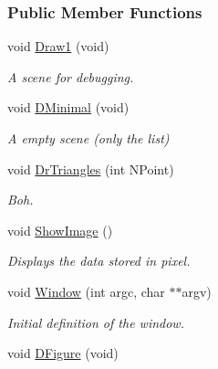 \subsubsection*{\-Public \-Member \-Functions}
\begin{DoxyCompactItemize}
\item 
\hypertarget{classDraw_a6d1a6c1ede3d0e58cbf0534c9c3ba943}{void \hyperlink{classDraw_a6d1a6c1ede3d0e58cbf0534c9c3ba943}{\-Draw1} (void)}\label{classDraw_a6d1a6c1ede3d0e58cbf0534c9c3ba943}

\begin{DoxyCompactList}\small\item\em \-A scene for debugging. \end{DoxyCompactList}\item 
\hypertarget{classDraw_a13a208315366febdc9db2eefb5f354ab}{void \hyperlink{classDraw_a13a208315366febdc9db2eefb5f354ab}{\-D\-Minimal} (void)}\label{classDraw_a13a208315366febdc9db2eefb5f354ab}

\begin{DoxyCompactList}\small\item\em \-A empty scene (only the list) \end{DoxyCompactList}\item 
\hypertarget{classDraw_a4d4cb243d25c9778b824719fc01d8b68}{void \hyperlink{classDraw_a4d4cb243d25c9778b824719fc01d8b68}{\-Dr\-Triangles} (int \-N\-Point)}\label{classDraw_a4d4cb243d25c9778b824719fc01d8b68}

\begin{DoxyCompactList}\small\item\em \-Boh. \end{DoxyCompactList}\item 
\hypertarget{classDraw_aded17e5e58c8d26011c3d2120b259fed}{void \hyperlink{classDraw_aded17e5e58c8d26011c3d2120b259fed}{\-Show\-Image} ()}\label{classDraw_aded17e5e58c8d26011c3d2120b259fed}

\begin{DoxyCompactList}\small\item\em \-Displays the data stored in pixel. \end{DoxyCompactList}\item 
\hypertarget{classDraw_a6768324ebecaa6d87d6e65bf242b23f9}{void \hyperlink{classDraw_a6768324ebecaa6d87d6e65bf242b23f9}{\-Window} (int argc, char $\ast$$\ast$argv)}\label{classDraw_a6768324ebecaa6d87d6e65bf242b23f9}

\begin{DoxyCompactList}\small\item\em \-Initial definition of the window. \end{DoxyCompactList}\item 
\hypertarget{classDraw_aa74f5eca0e42920b3ae0766299b85617}{void \hyperlink{classDraw_aa74f5eca0e42920b3ae0766299b85617}{\-D\-Figure} (void)}\label{classDraw_aa74f5eca0e42920b3ae0766299b85617}


\end{DoxyCompactItemize}
